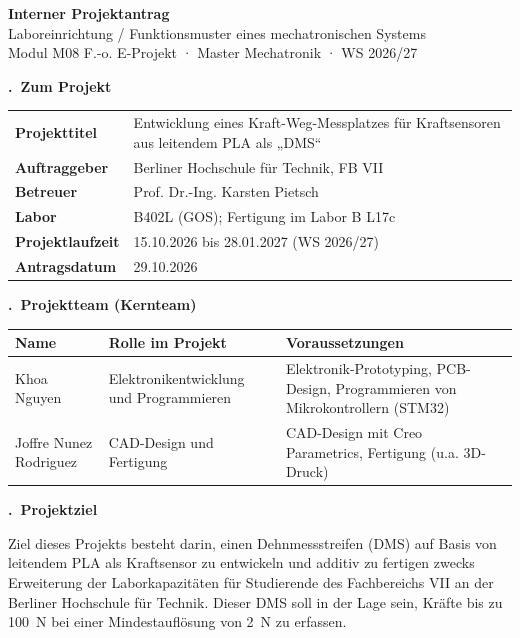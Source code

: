 \documentclass[11pt,a4paper]{article}
\newcounter{feldnr}
\newcommand{\formfeld}[1]{%
  \par\medskip\Needspace{6\baselineskip}\noindent
  \stepcounter{feldnr}%
  \colorbox{bhtgrau}{\parbox{\dimexpr\linewidth-2\fboxsep}{\textbf{\thefeldnr.\ #1}}}%
  \par\smallskip}
\begin{document}
\begin{center}
  {\Large\bfseries Interner Projektantrag}\\[2pt]
  {\large Laboreinrichtung / Funktionsmuster eines mechatronischen Systems}\\[2pt]
  {\small Modul M08 F.-o. E-Projekt · Master Mechatronik · WS 2026/27}
\end{center}

\formfeld{Zum Projekt}
\begin{tabularx}{\linewidth}{@{}>{\bfseries}p{4.2cm}X@{}}
Projekttitel     & Entwicklung eines Kraft-Weg-Messplatzes für Kraftsensoren aus leitendem PLA als „DMS“ \\
Auftraggeber     & Berliner Hochschule für Technik, FB VII \\
Betreuer         & Prof. Dr.-Ing. Karsten Pietsch \\
Labor            & B402L (GOS); Fertigung im Labor B L17c \\
Projektlaufzeit  & 15.10.2026 bis 28.01.2027 (WS 2026/27) \\
Antragsdatum     & 29.10.2026 \\
\end{tabularx}

\formfeld{Projektteam (Kernteam)}
\begin{tabularx}{\linewidth}{|X|X|X|l|}
\hline
\rowcolor{bhtgrau}\textbf{Name} & \textbf{Rolle im Projekt} & \textbf{Voraussetzungen} \\ \hline
Khoa Nguyen            & Elektronikentwicklung und Programmieren & Elektronik-Prototyping, PCB-Design, Programmieren von Mikrokontrollern (STM32) \\ \hline
Joffre Nunez Rodriguez & CAD-Design und Fertigung & CAD-Design mit Creo Parametrics, Fertigung (u.a. 3D-Druck) \\ \hline
\end{tabularx}

\formfeld{Projektziel}
Ziel dieses Projekts besteht darin, einen Dehnmessstreifen (DMS) auf Basis von leitendem PLA als Kraftsensor zu entwickeln und additiv zu fertigen zwecks Erweiterung
der Laborkapazitäten für Studierende des Fachbereichs VII an der Berliner Hochschule für Technik. 
Dieser DMS soll in der Lage sein, Kräfte bis zu \qty{100}{\newton} bei einer Mindestauflösung von \qty{2}{\newton} zu erfassen.  
\end{document}
